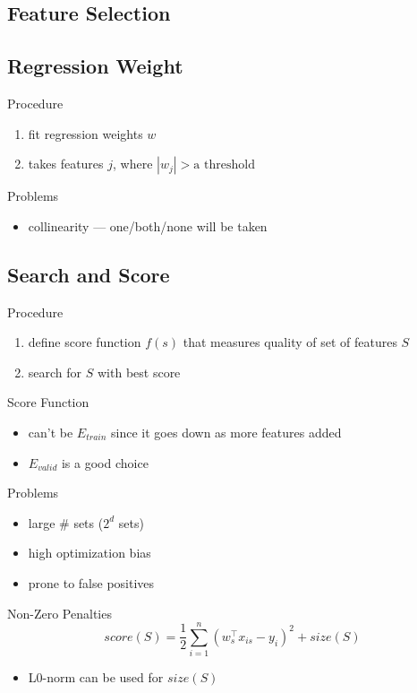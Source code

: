 \documentclass[10pt,landscape,a4paper]{article}
\begin{document}
\begin{multicols*}{5}
\section{Feature Selection}

\subsection{Regression Weight}
Procedure
\begin{enumerate}
    \item fit regression weights \(w\)
    \item takes features \(j\), where \(|w_j| > \text{a threshold }\)
\end{enumerate}
Problems
\begin{itemize}
    \item collinearity --- one/both/none will be taken
\end{itemize}

\subsection{Search and Score}
Procedure
\begin{enumerate}
    \item define score function \(f(s)\) that measures quality of set of features \(S\)
    \item search for \(S\) with best score
\end{enumerate}
Score Function
\begin{itemize}
    \item can't be \(E_{train}\) since it goes down as more features added
    \item \(E_{valid}\) is a good choice
\end{itemize}
Problems
\begin{itemize}
    \item large \# sets (\(2^d\) sets)
    \item high optimization bias
    \item prone to false positives
\end{itemize}
Non-Zero Penalties
\begin{dmath*}
    score(S) = \frac{1}{2} \sum_{i=1}^{n} (w_s^\intercal x_{is} - y_i)^2 + size(S)
\end{dmath*}
\begin{itemize}
    \item L0-norm can be used for \(size(S)\)
\end{itemize}


\end{multicols*}
\end{document}
